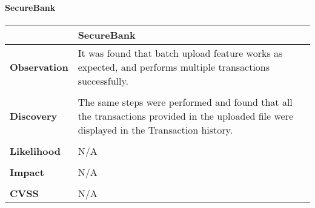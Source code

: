 \paragraph{SecureBank} \mbox{}
\begin{longtable*}{p{.20\textwidth} | p{.80\textwidth}}
    \hline
    & \textbf{SecureBank} \\
    \hline
    \textbf{Observation} &
        It was found that batch upload feature works as expected, and performs multiple transactions successfully.
    \\\\
    \textbf{Discovery} &
	    The same steps were performed and found that all the transactions provided in the uploaded file were displayed in the Transaction history.
    \\\\
    \textbf{Likelihood} &
        N/A
    \\\\
    \textbf{Impact} &
		N/A
    \\\\
    \textbf{CVSS} &
        N/A
    \\
    \hline
\end{longtable*}
\clearpage